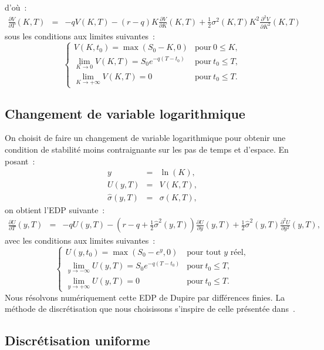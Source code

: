 d'o\`u~:
\begin{eqnarray*}
\frac{\partial V}{\partial T}(K,T) &=& -qV(K,T) - 
(r-q)K\frac{\partial V}{\partial K}(K,T) + 
\frac{1}{2}\sigma^2(K,T)K^2\frac{\partial^2 V}{\partial K^2}(K,T) 
\end{eqnarray*}
sous les conditions aux limites suivantes~: 
$$
\left \{
\begin{array}{ll}
V(K,t_0) = \max(S_0-K,0)& \text{pour}~ 0\leq K,\\
\lim_{K\rightarrow 0}V(K,T) = S_0e^{-q(T-t_0)} & 
\text{pour}~ t_0\leq T,\\
\lim_{K \rightarrow +\infty} V(K,T) = 0 & 
\text{pour}~ t_0\leq T.
\end{array}
\right .
$$

\subsection{Changement de variable logarithmique}

On choisit de faire un changement de variable logarithmique pour 
obtenir une condition de stabilit\'e moins contraignante sur les 
pas de temps et d'espace. En posant~: 
\begin{eqnarray*}
y &=& \ln (K), \\
U(y,T) &=& V(K,T),\\
\hat{\sigma}(y,T) &=& \sigma(K,T),
\end{eqnarray*}
on obtient l'EDP suivante~:
\begin{eqnarray*}
\frac{\partial U}{\partial T}(y,T) &=& -qU(y,T) - 
(r-q+\frac{1}{2}\hat{\sigma}^2(y,T)) 
\frac{\partial U}{\partial y}(y,T) + 
\frac{1}{2}\hat{\sigma}^2(y,T) 
\frac{\partial^2 U}{\partial y^2}(y,T), 
\end{eqnarray*}
avec les conditions aux limites suivantes~: 
$$
\left \{
\begin{array}{ll}
U(y,t_0) = \max(S_0-e^y,0)& \text{pour tout $y$ r\'eel},\\
\lim_{y \rightarrow -\infty}U(y,T) = S_0e^{-q(T-t_0)} & 
\text{pour}~ t_0\leq T,\\
\lim_{y \rightarrow +\infty} U(y,T) = 0 & 
\text{pour}~ t_0\leq T.
\end{array}
\right .
$$
Nous r\'esolvons num\'eriquement cette EDP de Dupire par 
diff\'erences finies. La m\'ethode de discr\'etisation que 
nous choisissons s'inspire de celle pr\'esent\'ee 
dans~\cite{lamb:ell:91}. 

\subsection{Discr\'etisation uniforme \label{unif}}

